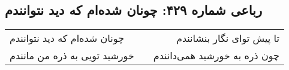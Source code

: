 \begin{center}
\section*{رباعی شماره ۴۲۹: چونان شده‌ام که دید نتوانندم}
\label{sec:sh429}
\begin{longtable}{l p{0.5cm} r}
چونان شده‌ام که دید نتوانندم
&&
تا پیش توای نگار بنشانندم
\\
خورشید تویی به ذره من مانندم
&&
چون ذره به خورشید همی‌دانندم
\\
\end{longtable}
\end{center}
